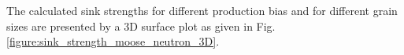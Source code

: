 \documentclass[a4paper]{article}
\begin{document}
  \newpage
      The calculated sink strengths for different production bias and for different grain sizes are presented by a 3D surface plot as given in Fig. \ref{figure:sink_strength_moose_neutron_3D}.
      \begin{figure}[h!]  %
        \centering

\end{figure}
\end{document}
